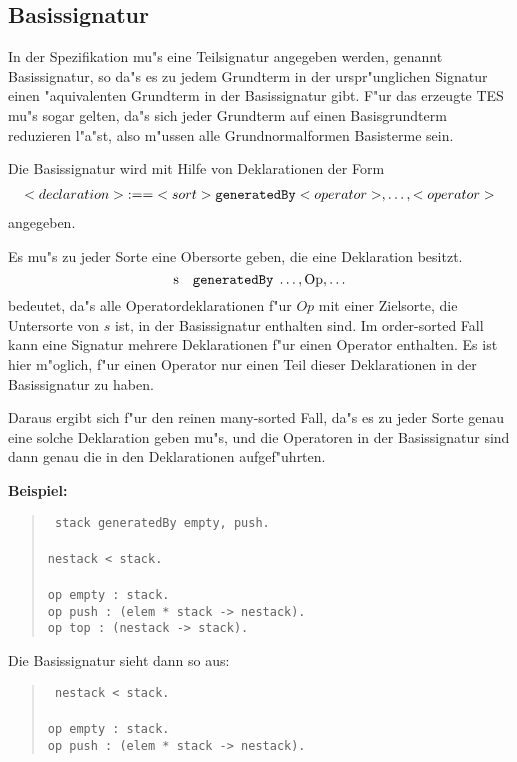 \subsection{Basissignatur}

In der Spezifikation mu"s eine Teilsignatur angegeben werden, genannt
Basissignatur, so da"s es zu jedem Grundterm in der urspr"unglichen
Signatur einen "aquivalenten Grundterm in der Basissignatur gibt. F"ur
das erzeugte TES mu"s sogar gelten, da"s sich jeder Grundterm auf einen
Basisgrundterm reduzieren l"a"st, also m"ussen alle Grundnormalformen
Basisterme sein.

Die Basissignatur wird mit Hilfe von Deklarationen der Form
\[\rm
\begin{array}{l@{\;:==\;}l}
<declaration> & <sort> {\tt generatedBy} <operator>,\ldots,<operator>
\end{array}
\]
angegeben.

Es mu"s zu jeder Sorte eine Obersorte geben, die eine Deklaration
besitzt.
\[\rm s \quad{\tt generatedBy}\; \ldots, Op, \ldots \]
bedeutet, da"s alle Operatordeklarationen f"ur $Op$ mit einer Zielsorte,
die Untersorte von $s$ ist, in der Basissignatur enthalten sind.
Im order-sorted Fall kann eine Signatur mehrere Deklarationen f"ur einen
Operator enthalten. Es ist hier m"oglich, f"ur einen Operator nur einen Teil
dieser Deklarationen in der Basissignatur zu haben.

Daraus ergibt sich f"ur den reinen many-sorted Fall, da"s es zu jeder
Sorte genau eine solche Deklaration geben mu"s, und die Operatoren in
der Basissignatur sind dann genau die in den Deklarationen aufgef"uhrten.

\medskip
{\bf Beispiel:}
\begin{verse}\tt
stack generatedBy empty, push.       \\
                                     \hfill\\
nestack < stack.                     \\
                                     \hfill\\
op empty : stack.                    \\
op push : (elem * stack -> nestack). \\
op top : (nestack -> stack).
\end{verse}
Die Basissignatur sieht dann so aus:
\begin{verse}\tt
nestack < stack.                     \\
                                     \hfill\\
op empty : stack.                    \\
op push : (elem * stack -> nestack). \\
\end{verse}

